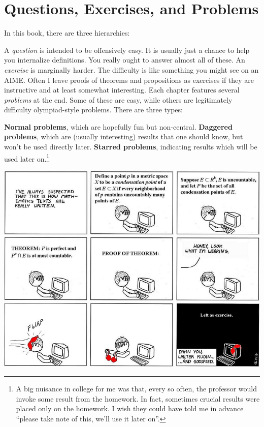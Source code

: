 \section{Questions, Exercises, and Problems}
In this book, there are three hierarchies:
\begin{itemize}
	\ii A \emph{question} is intended to be offensively easy.
	It is usually just a chance to help you internalize definitions.
	You really ought to answer almost all of these.
	\ii An \emph{exercise} is marginally harder.
	The difficulty is like something you might see on an AIME.
	Often I leave proofs of theorems and propositions as exercises
	if they are instructive and at least somewhat interesting.
	\ii Each chapter features several \emph{problems} at the end.
	Some of these are easy, while others are legitimately difficulty olympiad-style problems.
	There are three types:
	\begin{itemize}
		\ii \textbf{Normal problems}, which are hopefully fun but non-central.
		\ii \textbf{Daggered problems}, which are (usually interesting) results that one should know,
		but won't be used directly later.
		\ii \textbf{Starred problems}, indicating results which will be used later on.\footnote{%
			A big nuisance in college for me was that, every so often, the professor
			would invoke some result from the homework.
			In fact, sometimes crucial results were placed only on the homework.
			I wish they could have told me in advance ``please take note of this, we'll use it later on''.
		}
	\end{itemize}
\end{itemize}

\begin{center}
	\includegraphics[width=14cm]{media/abstruse-goose-exercise.png}
\end{center}

